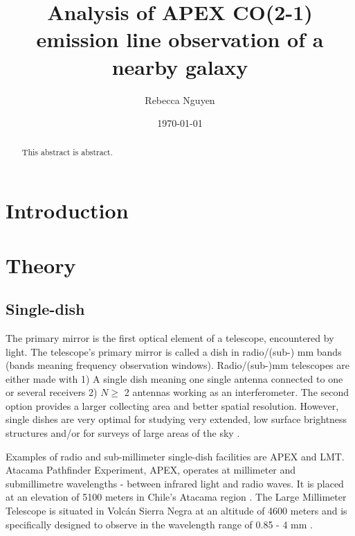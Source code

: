 \documentclass[reprint,english,notitlepage]{revtex4-2}  %
\begin{document}
\title{Analysis of APEX CO(2-1) emission line observation of a nearby galaxy}   %
\author{Rebecca Nguyen}               %
\date{\today}                             %
\noaffiliation                            %
\begin{abstract}                          %
This abstract is abstract.                %
\end{abstract}                            %
\maketitle                                %


\section{Introduction}

\section{Theory}   %
\subsection{Single-dish}
The primary mirror is the first optical element of a telescope, encountered by light. The telescope's primary mirror is called a dish in radio/(sub-) mm bands (bands meaning frequency observation windows). Radio/(sub-)mm telescopes are either made with 1) A single dish meaning one single antenna connected to one or several receivers 2) $N\geq$ 2 antennas working as an interferometer. The second option provides a larger collecting area and better spatial resolution. However, single dishes are very optimal for studying very extended, low surface brightness structures and/or for surveys of large areas of the sky \cite{lecturenotes}.

Examples of radio and sub-millimeter single-dish facilities are APEX and LMT. Atacama Pathfinder Experiment, APEX, operates at millimeter and submillimetre wavelengths - between infrared light and radio waves. It is placed at an elevation of 5100 meters in Chile's Atacama region \cite{APEX website}.
The Large Millimeter Telescope is situated in Volcán Sierra Negra at an altitude of 4600 meters and is specifically designed to observe in the wavelength range of 0.85 - 4 mm \cite{LMT website}.
\end{document}
